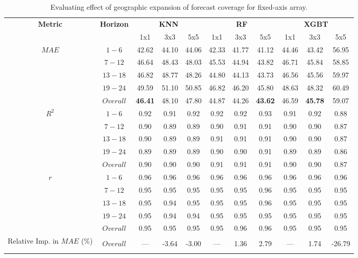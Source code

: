 \begin{table}[h]
\begin{center}
    \caption{Evaluating effect of geographic expansion of forecast coverage for fixed-axis array.}
    \begin{tabular}{c c c c c c c c c c c}
        \toprule
        \multirow{2}{*}{\textbf{Metric}} & \multirow{2}{*}{\textbf{Horizon}} & \multicolumn{3}{c}{\textbf{KNN}} & \multicolumn{3}{c}{\textbf{RF}} & \multicolumn{3}{c}{\textbf{XGBT}}\\
        \cmidrule{3-11}
         &  & 1x1 & 3x3 & 5x5 & 1x1 & 3x3 & 5x5 & 1x1 & 3x3 & 5x5 \\
        \midrule
        \multirow{5}{*}{$MAE$} & $1 - 6$ & 42.62 & 44.10 & 44.06 & 42.33 & 41.77 & 41.12 & 44.46 & 43.42 & 56.95 \\
        & $7 - 12$ & 46.64 & 48.43 & 48.03 & 45.53 & 44.94 & 43.82 & 46.71 & 45.84 & 58.85 \\
        & $13 - 18$ & 46.82 & 48.77 & 48.26 & 44.80 & 44.13 & 43.73 & 46.56 & 45.56 & 59.97 \\
        & $19 - 24$ & 49.59 & 51.10 & 50.85 & 46.82 & 46.20 & 45.80 & 48.63 & 48.32 & 60.49 \\
        & $Overall$ & \textbf{46.41} & 48.10 & 47.80 & 44.87 & 44.26 & \textbf{43.62} & 46.59 & \textbf{45.78} & 59.07 \\
        \midrule
        \multirow{5}{*}{$R^2$} & $1 - 6$ & 0.92 & 0.91 & 0.92 & 0.92 & 0.92 & 0.93 & 0.91 & 0.92 & 0.88 \\
        & $7 - 12$ & 0.90 & 0.89 & 0.89 & 0.90 & 0.91 & 0.91 & 0.90 & 0.90 & 0.87 \\
        & $13 - 18$ & 0.90 & 0.89 & 0.89 & 0.91 & 0.91 & 0.91 & 0.90 & 0.90 & 0.87 \\
        & $19 - 24$ & 0.89 & 0.89 & 0.89 & 0.90 & 0.90 & 0.91 & 0.89 & 0.89 & 0.86 \\
        & $Overall$ & 0.90 & 0.90 & 0.90 & 0.91 & 0.91 & 0.91 & 0.90 & 0.90 & 0.87 \\
        \midrule
        \multirow{5}{*}{$r$} & $1 - 6$ & 0.96 & 0.96 & 0.96 & 0.96 & 0.96 & 0.96 & 0.96 & 0.96 & 0.96 \\
        & $7 - 12$ & 0.95 & 0.95 & 0.95 & 0.95 & 0.95 & 0.96 & 0.95 & 0.95 & 0.95 \\
        & $13 - 18$ & 0.95 & 0.94 & 0.95 & 0.95 & 0.95 & 0.96 & 0.95 & 0.95 & 0.95 \\
        & $19 - 24$ & 0.95 & 0.94 & 0.94 & 0.95 & 0.95 & 0.95 & 0.95 & 0.95 & 0.95 \\
        & $Overall$ & 0.95 & 0.95 & 0.95 & 0.95 & 0.96 & 0.96 & 0.95 & 0.95 & 0.95 \\
        \bottomrule
        \multirow{3}{5em}{Relative Imp. in $MAE$ (\%)} & & & & & & & & & & \\ 
        & $Overall$ & --- & -3.64 & -3.00 & --- & 1.36 & 2.79 & --- & 1.74 & -26.79 \\
        & & & & & & & & & & \\
        \bottomrule
    \end{tabular}
\end{center}
\end{table}

